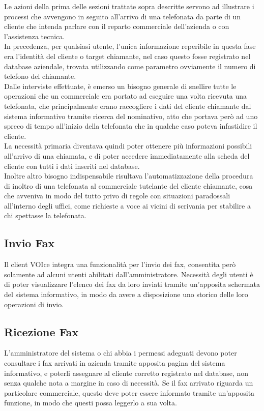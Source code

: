 \noindent
Le azioni della prima delle sezioni trattate sopra descritte servono ad illustrare i processi che avvengono in seguito all'arrivo di una telefonata da parte di un cliente che intenda parlare con il reparto commerciale dell'azienda o con l'assistenza tecnica. \\
In precedenza, per qualsiasi utente, l'unica informazione reperibile in questa fase era l'identit\`a del cliente o target chiamante, nel caso questo fosse registrato nel database aziendale, trovata utilizzando come parametro ovviamente il numero di telefono del chiamante. \\
Dalle interviste effettuate, \`e emerso un bisogno generale di snellire tutte le operazioni che un commerciale era portato ad eseguire una volta ricevuta una telefonata, che principalmente erano raccogliere i dati del cliente chiamante dal sistema informativo tramite ricerca del nominativo, atto che portava per\`o ad uno spreco di tempo all'inizio della telefonata che in qualche caso poteva infastidire il cliente. \\
La necessit\`a primaria diventava quindi poter ottenere pi\`u informazioni possibili all'arrivo di una chiamata, e di poter accedere immediatamente alla scheda del cliente con tutti i dati inseriti nel database.\\
Inoltre altro bisogno indispensabile risultava l'automatizzazione della procedura di inoltro di una telefonata al commerciale tutelante del cliente chiamante, cosa che avveniva in modo del tutto privo di regole con situazioni paradossali all'interno degli uffici, come richieste a voce ai vicini di scrivania per stabilire a chi spettasse la telefonata.

\subsection{Invio Fax}
Il client VOIce integra una funzionalit\`a per l'invio dei fax, consentita per\`o solamente ad alcuni utenti abilitati dall'amministratore. Necessit\`a degli utenti \`e di poter visualizzare l'elenco dei fax da loro inviati tramite un'apposita schermata del sistema informativo, in modo da avere a disposizione uno storico delle loro operazioni di invio.

\subsection{Ricezione Fax}
L'amministratore del sistema o chi abbia i permessi adeguati devono poter consultare i fax arrivati in azienda tramite apposita pagina del sistema informativo, e poterli assegnare al cliente corretto registrato nel database, non senza qualche nota a margine in caso di necessit\`a. Se il fax arrivato riguarda un particolare commerciale, questo deve poter essere informato tramite un'apposita funzione, in modo che questi possa leggerlo a sua volta.

